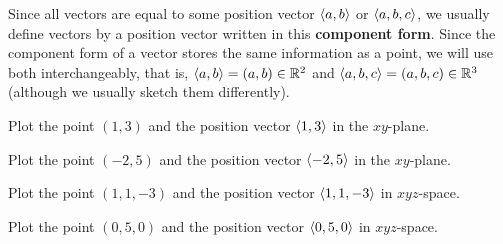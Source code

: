 \documentclass[letterpaper, twoside, 12pt]{book}
\begin{document}
\begin{definition}
  Since all vectors are equal to some position vector $\langle a,b\rangle$ or $\langle a,b,c\rangle$,
  we usually define vectors by a position vector written in this
  \textbf{component form}.
  Since the component form of a vector stores the same information as a point,
  we will use both interchangeably, that is, $\langle a,b\rangle=(a,b)\in\mathbb{R}^2$ and
  $\langle a,b,c\rangle=(a,b,c)\in\mathbb{R}^3$
  (although we usually sketch them differently).
\end{definition}

          \begin{problem}
            Plot the point $(1,3)$ and the position vector
            $\langle1,3\rangle$ in the $xy$-plane.
          \end{problem}

          \begin{solution}

          \end{solution}

          \begin{problem}
            Plot the point $(-2,5)$ and the position vector
            $\langle-2,5\rangle$ in the $xy$-plane.
          \end{problem}

          \begin{solution}

          \end{solution}

          \begin{problem}
            Plot the point $(1,1,-3)$ and the position vector
            $\langle1,1,-3\rangle$ in $xyz$-space.
          \end{problem}

          \begin{solution}

          \end{solution}

          \begin{problem}
            Plot the point $(0,5,0)$ and the position vector
            $\langle0,5,0\rangle$ in $xyz$-space.
          \end{problem}

          \begin{solution}

          \end{solution}
\end{document}
